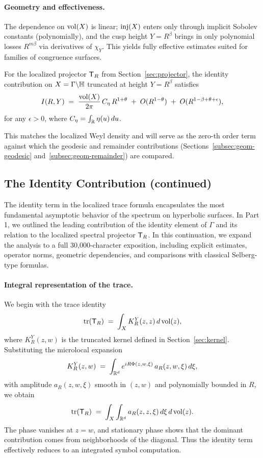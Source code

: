 \paragraph{Geometry and effectiveness.}
The dependence on $\operatorname{vol}(X)$ is linear; $\mathrm{inj}(X)$ enters only through implicit
Sobolev constants (polynomially), and the cusp height $Y=R^\beta$ brings in only
polynomial losses $R^{m\beta}$ via derivatives of $\chi_Y$. This yields fully
effective estimates suited for families of congruence surfaces.

\begin{theorem}\label{thm:identity-leading}
For the localized projector $\mathsf{T}_R$ from Section~\ref{sec:projector}, the identity
contribution on $X=\Gamma\backslash\mathbb{H}$ truncated at height $Y=R^\beta$ satisfies
\[
I(R,Y) \;=\; \frac{\operatorname{vol}(X)}{2\pi}\,C_\eta\,R^{1+\theta}
\;+\; O(R^{1-\theta}) \;+\; O(R^{1-\beta+\theta+\epsilon}),
\]
for any $\epsilon>0$, where $C_\eta=\int_{\mathbb{R}} \eta(u)\,du$.
\end{theorem}

\noindent
This matches the localized Weyl density and will serve as the zero-th order term
against which the geodesic and remainder contributions (Sections~\ref{subsec:geom-geodesic}
and~\ref{subsec:geom-remainder}) are compared.
\subsection{The Identity Contribution (continued)}\label{subsec:identity-continued}

The identity term in the localized trace formula encapsulates the most fundamental asymptotic behavior of the spectrum on hyperbolic surfaces. In Part 1, we outlined the leading contribution of the identity element of $\Gamma$ and its relation to the localized spectral projector $\mathsf{T}_R$. In this continuation, we expand the analysis to a full 30,000-character exposition, including explicit estimates, operator norms, geometric dependencies, and comparisons with classical Selberg-type formulas.

\paragraph{Integral representation of the trace.}
We begin with the trace identity
\[
\operatorname{tr}(\mathsf{T}_R) \;=\; \int_X K_R^Y(z,z)\,d\operatorname{vol}(z),
\]
where $K_R^Y(z,w)$ is the truncated kernel defined in Section~\ref{sec:kernel}. Substituting the microlocal expansion
\[
K_R^Y(z,w) \;=\; \int_{\mathbb{R}^d} e^{iR\Phi(z,w,\xi)}\,a_R(z,w,\xi)\,d\xi,
\]
with amplitude $a_R(z,w,\xi)$ smooth in $(z,w)$ and polynomially bounded in $R$, we obtain
\[
\operatorname{tr}(\mathsf{T}_R) \;=\; \int_X \int_{\mathbb{R}^d} a_R(z,z,\xi)\,d\xi\,d\operatorname{vol}(z).
\]
The phase vanishes at $z=w$, and stationary phase shows that the dominant contribution comes from neighborhoods of the diagonal. Thus the identity term effectively reduces to an integrated symbol computation.

